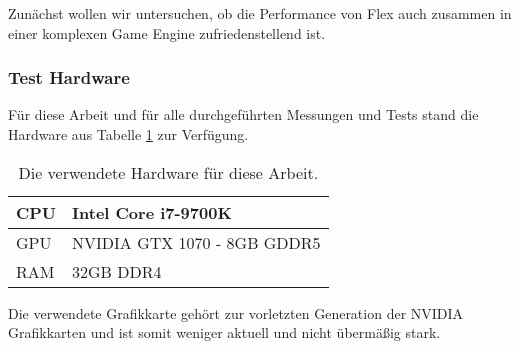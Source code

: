 
Zunächst wollen wir untersuchen, ob die Performance von Flex auch zusammen in einer komplexen Game Engine zufriedenstellend ist.

\subsubsection{Test Hardware}

Für diese Arbeit und für alle durchgeführten Messungen und Tests stand die Hardware aus Tabelle \ref{table_hardware} zur Verfügung.

\clearpage

\begin{table}[]
\centering
\caption{Die verwendete Hardware für diese Arbeit.}
\label{table_hardware}
\begin{tabular}{l|l}
 \hline
CPU & Intel Core i7-9700K  \\ \hline
GPU & NVIDIA GTX 1070 - 8GB GDDR5      \\ \hline
RAM & 32GB DDR4            \\ \hline
\end{tabular}
\end{table}

Die verwendete Grafikkarte gehört zur vorletzten Generation der NVIDIA Grafikkarten und ist somit weniger aktuell und nicht übermäßig stark.



